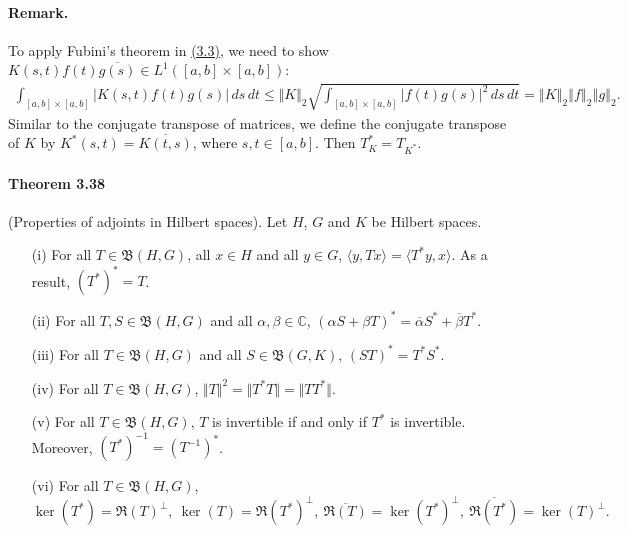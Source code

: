 \documentclass{article}
\begin{document}
\paragraph{Remark.} To apply Fubini's theorem in \hyperref[eq:3.3]{(3.3)}, we need to show $K(s,t)f(t)\overline{g(s)}\in L^1([a,b]\times[a,b])$:
\begin{align*}
	\int_{[a,b]\times[a,b]}\vert K(s,t) f(t)g(s)\vert\,ds\,dt \leq \Vert K\Vert_2\sqrt{\int_{[a,b]\times[a,b]}\vert f(t)g(s)\vert^2\,ds\,dt} = \left\Vert K\right\Vert_2\left\Vert f\right\Vert_2\left\Vert g\right\Vert_2.
\end{align*}
Similar to the conjugate transpose of matrices, we define the conjugate transpose of $K$ by $K^*(s,t)=\overline{K(t,s)}$, where $s,t\in[a,b]$. Then $T_K^*=T_{K^*}$.

\paragraph{Theorem 3.38\label{thm:3.38}} (Properties of adjoints in Hilbert spaces). Let $H$, $G$ and $K$ be Hilbert spaces.
\begin{itemize}
	\vspace{0.1cm}
	\item[(i)] For all $T\in\mathfrak{B}(H,G)$, all $x\in H$ and all $y\in G$, $\langle y,Tx\rangle = \langle T^*y,x\rangle$. As a result, $(T^*)^*=T$.
	\vspace{0.1cm}
	\item[(ii)] For all $T,S\in\mathfrak{B}(H,G)$ and all $\alpha,\beta\in\mathbb{C}$, $(\alpha S+\beta T)^* = \overline{\alpha}S^*+\overline{\beta}T^*$.
	\vspace{0.1cm}
	\item[(iii)] For all $T\in\mathfrak{B}(H,G)$ and all $S\in\mathfrak{B}(G,K)$, $(ST)^* = T^*S^*$.
	\vspace{0.1cm}
	\item[(iv)] For all $T\in\mathfrak{B}(H,G)$, $\Vert T\Vert^2=\Vert T^*T\Vert = \Vert TT^*\Vert$.
	\vspace{0.1cm}
	\item[(v)] For all $T\in\mathfrak{B}(H,G)$, $T$ is invertible if and only if $T^*$ is invertible. Moreover, $(T^*)^{-1}=(T^{-1})^*$.
	\vspace{0.1cm}
	\item[(vi)] For all $T\in\mathfrak{B}(H,G)$, $$\ker(T^*) = \mathfrak{R}(T)^\perp,\ \ker(T) = \mathfrak{R}(T^*)^\perp,\ \overline{\mathfrak{R}(T)} = \ker(T^*)^\perp,\ \overline{\mathfrak{R}(T^*)} = \ker(T)^\perp.$$
\end{itemize}
\end{document}
